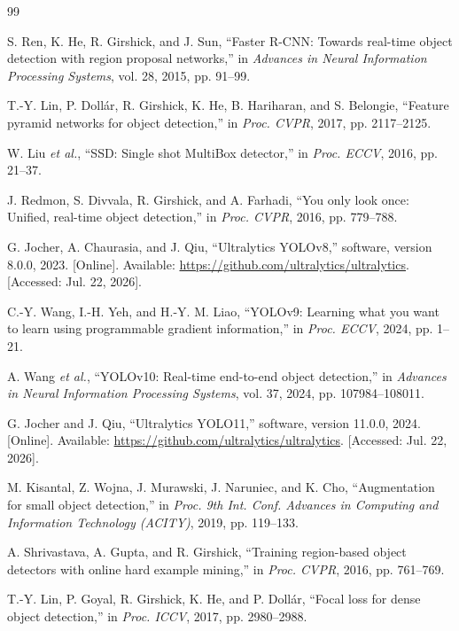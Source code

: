 \documentclass[conference,a4paper]{IEEEtran}
\begin{document}
\begin{thebibliography}{99}

S. Ren, K. He, R. Girshick, and J. Sun, ``Faster R-CNN: Towards real-time object detection with region proposal networks,'' in \emph{Advances in Neural Information Processing Systems}, vol. 28, 2015, pp. 91--99.

T.-Y. Lin, P. Doll\'ar, R. Girshick, K. He, B. Hariharan, and S. Belongie, ``Feature pyramid networks for object detection,'' in \emph{Proc. CVPR}, 2017, pp. 2117--2125.

W. Liu \emph{et al.}, ``SSD: Single shot MultiBox detector,'' in \emph{Proc. ECCV}, 2016, pp. 21--37.

J. Redmon, S. Divvala, R. Girshick, and A. Farhadi, ``You only look once: Unified, real-time object detection,'' in \emph{Proc. CVPR}, 2016, pp. 779--788.

G. Jocher, A. Chaurasia, and J. Qiu, ``Ultralytics YOLOv8,'' software, version 8.0.0, 2023. [Online]. Available: \url{https://github.com/ultralytics/ultralytics}. [Accessed: Jul. 22, 2026].

C.-Y. Wang, I.-H. Yeh, and H.-Y. M. Liao, ``YOLOv9: Learning what you want to learn using programmable gradient information,'' in \emph{Proc. ECCV}, 2024, pp. 1--21.

A. Wang \emph{et al.}, ``YOLOv10: Real-time end-to-end object detection,'' in \emph{Advances in Neural Information Processing Systems}, vol. 37, 2024, pp. 107984--108011.

G. Jocher and J. Qiu, ``Ultralytics YOLO11,'' software, version 11.0.0, 2024. [Online]. Available: \url{https://github.com/ultralytics/ultralytics}. [Accessed: Jul. 22, 2026].

M. Kisantal, Z. Wojna, J. Murawski, J. Naruniec, and K. Cho, ``Augmentation for small object detection,'' in \emph{Proc. 9th Int. Conf. Advances in Computing and Information Technology (ACITY)}, 2019, pp. 119--133.

A. Shrivastava, A. Gupta, and R. Girshick, ``Training region-based object detectors with online hard example mining,'' in \emph{Proc. CVPR}, 2016, pp. 761--769.

T.-Y. Lin, P. Goyal, R. Girshick, K. He, and P. Doll\'ar, ``Focal loss for dense object detection,'' in \emph{Proc. ICCV}, 2017, pp. 2980--2988.


\end{thebibliography}
\end{document}
